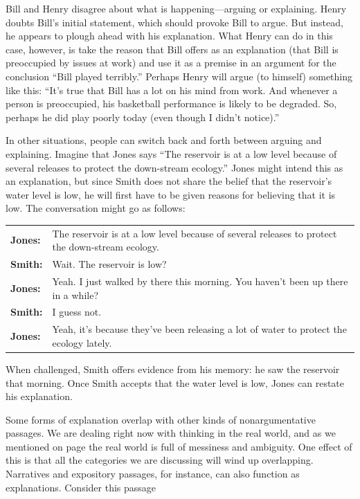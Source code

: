 Bill and Henry disagree about what is happening---arguing or explaining. Henry doubts Bill's initial statement, which should provoke Bill to argue. But instead, he appears to plough ahead with his explanation. What Henry can do in this case, however, is take the reason that Bill offers as an explanation (that Bill is preoccupied by issues at work) and use it as a premise in an argument for the conclusion ``Bill played terribly.'' Perhaps Henry will argue (to himself) something like this: ``It's true that Bill has a lot on his mind from work. And whenever a person is preoccupied, his basketball performance is likely to be degraded. So, perhaps he did play poorly today (even though I didn't notice).''

In other situations, people can switch back and forth between arguing and explaining. Imagine that Jones says ``The reservoir is at a low level because of several releases to protect the down-stream ecology.'' Jones might intend this as an explanation, but since Smith does not share the belief that the reservoir's water level is low, he will first have to be given reasons for believing that it is low. The conversation might go as follows:

\begin{adjustwidth}{2em}{0em}
\begin{longtabu}{p{.1\linewidth}p{.8\linewidth}}
\textbf{Jones:} & The reservoir is at a low level because of several releases to protect the down-stream ecology. \\
\textbf{Smith:} & Wait. The reservoir is low?\\
\textbf{Jones:} & Yeah. I just walked by there this morning. You haven't been up there in a while? \\
\textbf{Smith:} & I guess not. \\
\textbf{Jones:} & Yeah, it's because they've been releasing a lot of water to protect the ecology lately. \\
\end{longtabu}
\end{adjustwidth}
\vspace{-1cm}

When challenged, Smith offers evidence from his memory: he saw the reservoir that morning. Once Smith accepts that the water level is low, Jones can restate his explanation.

Some forms of explanation overlap with other kinds of nonargumentative passages. We are dealing right now with thinking in the real world, and as we mentioned on page \pageref{messiness_warning} the real world is full of messiness and ambiguity. One effect of this is that all the categories we are discussing will wind up overlapping. Narratives and expository passages, for instance, can also function as explanations. Consider this passage

